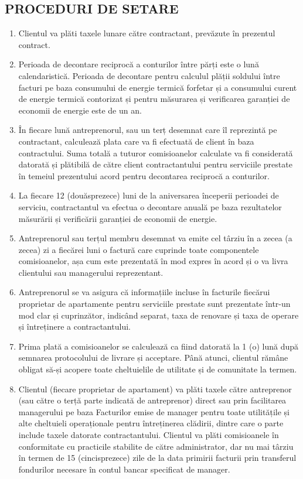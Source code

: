 \begin{multicols}{2}
\subsection{PROCEDURI DE SETARE}
\begin{enumerate}
\item Clientul va plăti taxele lunare către contractant, prevăzute în prezentul contract.
\item Perioada de decontare reciprocă a conturilor între părți este o lună calendaristică. Perioada de decontare pentru calculul plății soldului între facturi pe baza consumului de energie termică forfetar și a consumului curent de energie termică contorizat și pentru măsurarea și verificarea garanției de economii de energie este de un an.
\item În fiecare lună antreprenorul, sau un terț desemnat care îl reprezintă pe contractant, calculează plata care va fi efectuată de client în baza contractului. Suma totală a tuturor comisioanelor calculate va fi considerată datorată și plătibilă de către client contractantului pentru serviciile prestate în temeiul prezentului acord pentru decontarea reciprocă a conturilor.
\item La fiecare 12 (douăsprezece) luni de la aniversarea începerii perioadei de serviciu, contractantul va efectua o decontare anuală pe baza rezultatelor măsurării și verificării garanției de economii de energie.
\item Antreprenorul sau terțul membru desemnat va emite cel târziu în a zecea (a zecea) zi a fiecărei luni o factură care cuprinde toate componentele comisioanelor, așa cum este prezentată în mod expres în acord și o va livra clientului sau managerului reprezentant.
\item Antreprenorul se va asigura că informațiile incluse în facturile fiecărui proprietar de apartamente pentru serviciile prestate sunt prezentate într-un mod clar și cuprinzător, indicând separat, taxa de renovare și taxa de operare și întreținere a contractantului.
\item Prima plată a comisioanelor se calculează ca fiind datorată la 1 (o) lună după semnarea protocolului de livrare și acceptare. Până atunci, clientul rămâne obligat să-și acopere toate cheltuielile de utilitate și de comunitate la termen.
\item Clientul (fiecare proprietar de apartament) va plăti taxele către antreprenor (sau către o terță parte indicată de antreprenor) direct sau prin facilitarea managerului pe baza Facturilor emise de manager pentru toate utilitățile și alte cheltuieli operaționale pentru întreținerea clădirii, dintre care o parte include taxele datorate contractantului. Clientul va plăti comisioanele în conformitate cu practicile stabilite de către administrator, dar nu mai târziu în termen de 15 (cincisprezece) zile de la data primirii facturii prin transferul fondurilor necesare în contul bancar specificat de manager.

\end{enumerate}
\end{multicols}
